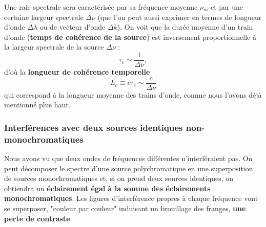 \documentclass[11pt,a4paper]{report}
\begin{document}
Une raie spectrale sera caractérisée par sa fréquence moyenne $\nu_m$ et par une certaine largeur spectrale $\Delta\nu$ (que l'on peut aussi exprimer en termes de longueur d'onde $\Delta \lambda$ ou de vecteur d'onde $\Delta k$). On voit que la durée moyenne d'un train d'onde (\textbf{temps de cohérence de la source}) est inversement proportionnelle à la largeur spectrale de la source $\Delta\nu$ :\\
\begin{equation}
	\boxed{\tau_c \sim \frac{1}{\Delta\nu}},
\end{equation}
d'où la \textbf{longueur de cohérence temporelle}
\begin{equation}
	L_c \equiv c\tau_c \sim \frac{c}{\Delta\nu}
\end{equation}
qui correspond à la longueur moyenne des trains d'onde, comme nous l'avons déjà mentionné plus haut.

\subsubsection{Interférences avec deux sources identiques non-monochromatiques}

Nous avons vu que deux ondes de fréquences différentes n'interféraient pas. On peut décomposer le spectre d'une source polychromatique en une superposition de sources monochromatiques et, si on prend deux sources identiques, on obtiendra un \textbf{éclairement égal à la somme des éclairements monochromatiques}. Les figures d'interférence propres à chaque fréquence vont se superposer, "couleur par couleur" induisant un brouillage des franges, \textbf{une perte de contraste}.\\ 
\end{document}
